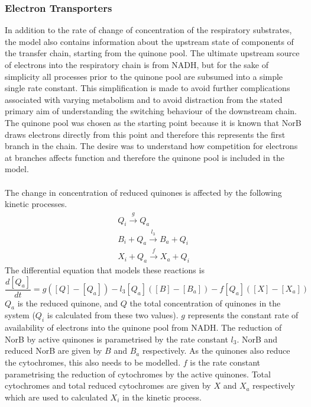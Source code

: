 \subsubsection{Electron Transporters}

In addition to the rate of change of concentration of the respiratory substrates, the model also contains information about the upstream state of components of the transfer chain, starting from the quinone pool. The ultimate upstream source of electrons into the respiratory chain is from NADH, but for the sake of simplicity all processes prior to the quinone pool are subsumed into a simple single rate constant. This simplification is made to avoid further complications associated with varying metabolism and to avoid distraction from the stated primary aim of understanding the switching behaviour of the downstream chain. The quinone pool was chosen as the starting point because it is known that NorB draws electrons directly from this point and therefore this represents the first branch in the chain. The desire was to understand how competition for electrons at branches affects function and therefore the quinone pool is included in the model.\\
\clearpage
{}\\
The change in concentration of reduced quinones is affected by the following kinetic processes.
\begin{equation*}
\begin{gathered}
Q_i \xrightarrow{g} Q_a\\
B_i + Q_a \xrightarrow{l_3} B_a + Q_i\\
X_i + Q_a \xrightarrow{f} X_a + Q_i
\end{gathered}
\end{equation*}
The differential equation that models these reactions is
\begin{equation}
\frac{d[Q_a]}{dt} = g([Q] - [Q_a]) - l_3[Q_a]([B] - [B_a]) - f[Q_a]([X]-[X_a])
\label{eq:quinones}
\end{equation}
$Q_a$ is the reduced quinone, and $Q$ the total concentration of quinones in the system ($Q_i$ is calculated from these two values). $g$ represents the constant rate of availability of electrons into the quinone pool from NADH. The reduction of NorB by active quinones is parametrised by the rate constant $l_3$. NorB and reduced NorB are given by $B$ and $B_a$ respectively. As the quinones also reduce the cytochromes, this also needs to be modelled. $f$ is the rate constant parametrising the reduction of cytochromes by the active quinones. Total cytochromes and total reduced cytochromes are given by $X$ and $X_a$ respectively which are used to calculated $X_i$ in the kinetic process.\\
